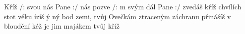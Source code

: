 \begin{TEXT}{Kříž}
\REFREN  /:  svou nás Pane :/ \NL
{}  nás pozve  \NL
/: m svým dál Pane :/ \NL
{}  zvedáš kříž   
\SLOKA {} chvílích stot věku ízíš \NL
{}ý ný bod  zemi, tvůj   
\SLOKA Ovečkám ztraceným záchranu přinášíš \NL
v bloudění kéž je jim majákem tvůj kříž \NL
\end{TEXT}
